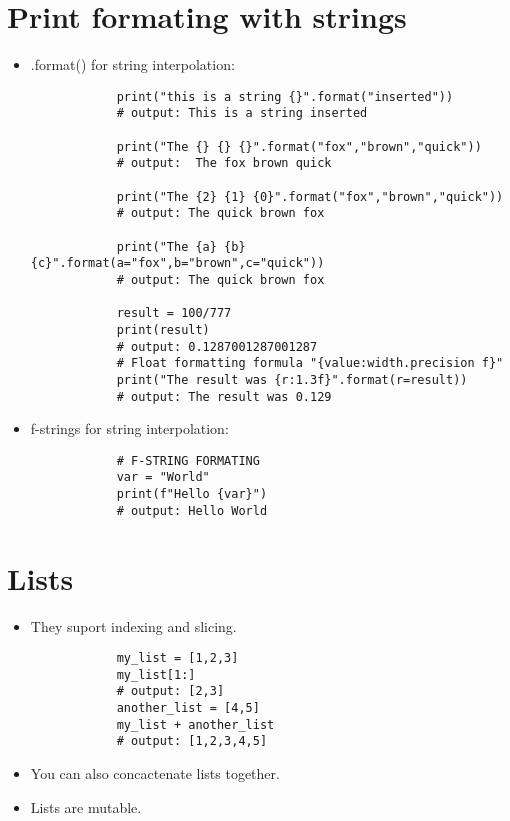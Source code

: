 \section{Print formating with strings}
\begin{itemize}
    \item .format() for string interpolation:
        \begin{verbatim}
            print("this is a string {}".format("inserted"))
            # output: This is a string inserted

            print("The {} {} {}".format("fox","brown","quick"))
            # output:  The fox brown quick 

            print("The {2} {1} {0}".format("fox","brown","quick"))
            # output: The quick brown fox

            print("The {a} {b} {c}".format(a="fox",b="brown",c="quick"))
            # output: The quick brown fox

            result = 100/777
            print(result) 
            # output: 0.1287001287001287
            # Float formatting formula "{value:width.precision f}"
            print("The result was {r:1.3f}".format(r=result))
            # output: The result was 0.129 
        \end{verbatim}

    \item f-strings for string interpolation: 
        \begin{verbatim}
            # F-STRING FORMATING
            var = "World"
            print(f"Hello {var}")
            # output: Hello World
        \end{verbatim}
\end{itemize}

\section{Lists}
\begin{itemize}
    \item They suport indexing and slicing.
        \begin{verbatim}
            my_list = [1,2,3] 
            my_list[1:]
            # output: [2,3]
            another_list = [4,5]
            my_list + another_list 
            # output: [1,2,3,4,5]
        \end{verbatim}
        
    \item You can also concactenate lists together. 
    \item Lists are mutable. 
\end{itemize}
